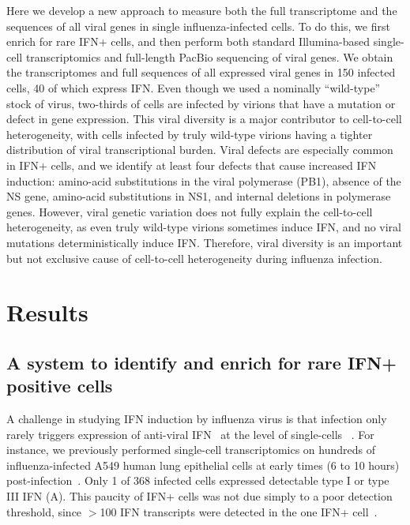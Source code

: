 \documentclass[9pt,lineno]{elife}
\begin{document}
Here we develop a new approach to measure both the full transcriptome and the sequences of all viral genes in single influenza-infected cells.
To do this, we first enrich for rare IFN+ cells, and then perform both standard Illumina-based single-cell transcriptomics and full-length PacBio sequencing of viral genes.
We obtain the transcriptomes and full sequences of all expressed viral genes in 150 infected cells, 40 of which express IFN.
Even though we used a nominally ``wild-type'' stock of virus, two-thirds of cells are infected by virions that have a mutation or defect in gene expression.
This viral diversity is a major contributor to cell-to-cell heterogeneity, with cells infected by truly wild-type virions having a tighter distribution of viral transcriptional burden.
Viral defects are especially common in IFN+ cells, and we identify at least four defects that cause increased IFN induction: amino-acid substitutions in the viral polymerase (PB1), absence of the NS gene, amino-acid substitutions in NS1, and internal deletions in polymerase genes.
However, viral genetic variation does not fully explain the cell-to-cell heterogeneity, as even truly wild-type virions sometimes induce IFN, and no viral mutations deterministically induce IFN.
Therefore, viral diversity is an important but not exclusive cause of cell-to-cell heterogeneity during influenza infection.

\section{Results}

\subsection{A system to identify and enrich for rare IFN+ positive cells}
A challenge in studying IFN induction by influenza virus is that infection only rarely triggers expression of anti-viral IFN~\citep[type I and type III;][]{kotenko2017contribution} at the level of single-cells ~\citep{killip2017single}.
For instance, we previously performed single-cell transcriptomics on hundreds of influenza-infected A549 human lung epithelial cells at early times (6 to 10 hours) post-infection~\citep{russell2018extreme}.
Only 1 of 368 infected cells expressed detectable type I or type III IFN (A).
This paucity of IFN+ cells was not due simply to a poor detection threshold, since $>$100 IFN transcripts were detected in the one IFN+ cell~\citep{russell2018extreme}.
\end{document}
